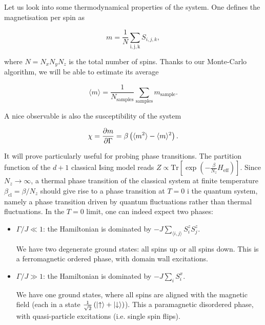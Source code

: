 \documentclass[11pt,openany]{article}
\begin{document}
Let us look into some thermodynamical properties of the system. One defines the magnetisation per spin as

\begin{equation}
	m = \frac{1}{N}\sum_\mathrm{i,j,k}S_{i,j,k},
\end{equation}

where $N=N_xN_yN_z$ is the total number of spins. Thanks to our Monte-Carlo algorithm, we will be able to estimate its average

\begin{equation}
	\langle m\rangle = \frac{1}{N_\mathrm{samples}}\sum_\mathrm{samples} m_\mathrm{sample}.
\end{equation}

A nice observable is also the susceptibility of the system

\begin{equation}
	\chi = \frac{\partial m}{\partial\Gamma} = \beta\left(\langle m^2\rangle - \langle m\rangle^2\right).
\end{equation}

It will prove particularly useful for probing phase transitions. The partition function of the $d+1$ classical Ising model reads $Z\propto\mathrm{Tr}\left[\exp\left(-\frac{\beta}{N_z}H_\mathrm{eff}\right)\right]$. Since $N_z\to\infty$, a thermal phase transition of the classical system at finite temperature $\beta_{\mathrm{cl}}=\beta/N_z$ should give rise to a phase transition at $T=0$ i the quantum system, namely a phase transition driven by quantum fluctuations rather than thermal fluctuations. In the $T=0$ limit, one can indeed expect two phases:

\begin{itemize}
	
	\item $\Gamma/J \ll 1$: the Hamiltonian is dominated by $\displaystyle-J\sum_{\langle i,j\rangle}S^z_iS^z_j$.
	
	We have two degenerate ground states: all spins up or all spins down. This is a ferromagnetic ordered phase, with domain wall excitations.
	
	\item $\Gamma/J \gg 1$: the Hamiltonian is dominated by $\displaystyle-J\sum_iS^x_i$.
	
	We have one ground states, where all spins are aligned with the magnetic field (each in a state $\frac{1}{\sqrt{2}}\left(\ket{\uparrow}+\ket{\downarrow}\right)$). This a paramagnetic disordered phase, with quasi-particle excitations (i.e. single spin flips).
	
\end{itemize}
\end{document}
